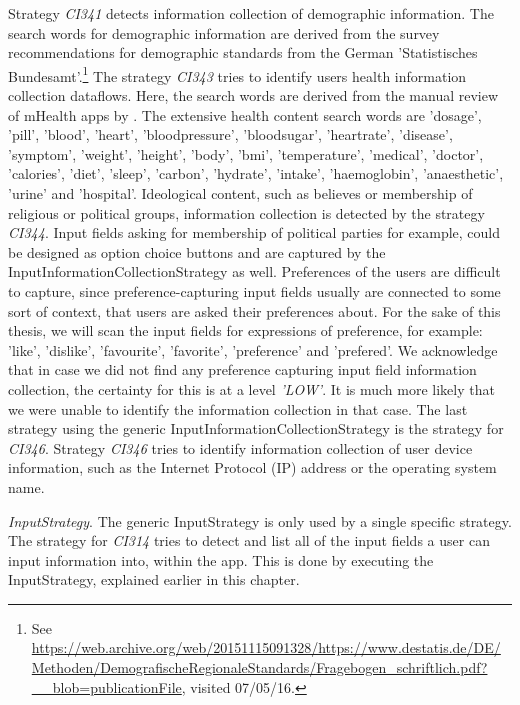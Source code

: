 Strategy \textit{CI341} detects information collection of demographic information.
The search words for demographic information are derived from the survey recommendations for demographic standards from the German 'Statistisches Bundesamt'.\footnote{\raggedright See \url{https://web.archive.org/web/20151115091328/https://www.destatis.de/DE/Methoden/DemografischeRegionaleStandards/Fragebogen_schriftlich.pdf?__blob=publicationFile}, visited 07/05/16.}
The strategy \textit{CI343} tries to identify users health information collection dataflows.
Here, the search words are derived from the manual review of mHealth apps by \textcite{Bruggemann2016}. 
The extensive health content search words are 'dosage', 'pill', 'blood', 'heart', 'bloodpressure', 'bloodsugar', 'heartrate', 'disease', 'symptom', 'weight', 'height', 'body', 'bmi', 'temperature', 'medical', 'doctor', 'calories', 'diet', 'sleep', 'carbon', 'hydrate', 'intake', 'haemoglobin', 'anaesthetic', 'urine' and 'hospital'.
Ideological content, such as believes or membership of religious or political groups, information collection is detected by the strategy \textit{CI344}.
Input fields asking for membership of political parties for example, could be designed as option choice buttons and are captured by the InputInformationCollectionStrategy as well.
Preferences of the users are difficult to capture, since preference-capturing input fields usually are connected to some sort of context, that users are asked their preferences about.
For the sake of this thesis, we will scan the input fields for expressions of preference, for example: 'like', 'dislike', 'favourite', 'favorite', 'preference' and 'prefered'.
We acknowledge that in case we did not find any preference capturing input field information collection, the certainty for this is at a level \textit{'LOW'}.
It is much more likely that we were unable to identify the information collection in that case.
The last strategy using the generic InputInformationCollectionStrategy is the strategy for \textit{CI346}. 
Strategy \textit{CI346} tries to identify information collection of user device information, such as the Internet Protocol (\acs{IP}) address or the operating system name.

\textit{InputStrategy}. The generic InputStrategy is only used by a single specific strategy.
The strategy for \textit{CI314} tries to detect and list all of the input fields a user can input information into, within the app.
This is done by executing the InputStrategy, explained earlier in this chapter.

